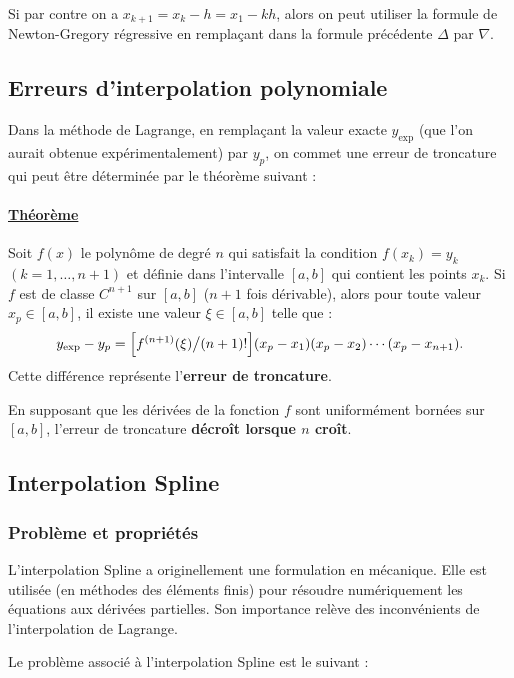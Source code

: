 Si par contre on a $x_{k+1} = x_k - h = x_1 - kh$, alors on peut utiliser la
formule de Newton-Gregory régressive en remplaçant dans la formule précédente
$\Delta$ par $\nabla$.

\subsection{Erreurs d'interpolation polynomiale}

Dans la méthode de Lagrange, en remplaçant la valeur exacte $y_{\exp}$ (que
l'on aurait obtenue expérimentalement) par $y_p$, on commet une erreur de
troncature qui peut être déterminée par le théorème suivant :

\paragraph{\underline{Théorème}} Soit $f(x)$ le polynôme de degré $n$ qui
satisfait la condition $f(x_k) = y_k$ $(k = 1, \dots, n+1)$ et définie dans
l'intervalle $[a,b]$ qui contient les points $x_k$. Si $f$ est de classe
$C^{n+1}$ sur $[a,b]$ ($n+1$ fois dérivable), alors pour toute valeur
$x_p \in [a,b]$, il existe une valeur $\xi \in [a,b]$ telle que :
\[
  y_{\exp} - y_p = \Bigl[f^{(n+1)}(\xi)\big/(n+1)!\Bigr]
                   (x_p - x_1)(x_p - x_2)\cdots(x_p - x_{n+1}) .
\]
Cette différence représente l'\textbf{erreur de troncature}.

En supposant que les dérivées de la fonction $f$ sont uniformément bornées sur
$[a,b]$, l'erreur de troncature \textbf{décroît lorsque $n$ croît}.

\subsection{Interpolation Spline}

\subsubsection{Problème et propriétés}

L'interpolation Spline a originellement une formulation en mécanique. Elle est
utilisée (en méthodes des éléments finis) pour résoudre numériquement les
équations aux dérivées partielles. Son importance relève des inconvénients de
l'interpolation de Lagrange.

Le problème associé à l'interpolation Spline est le suivant :

